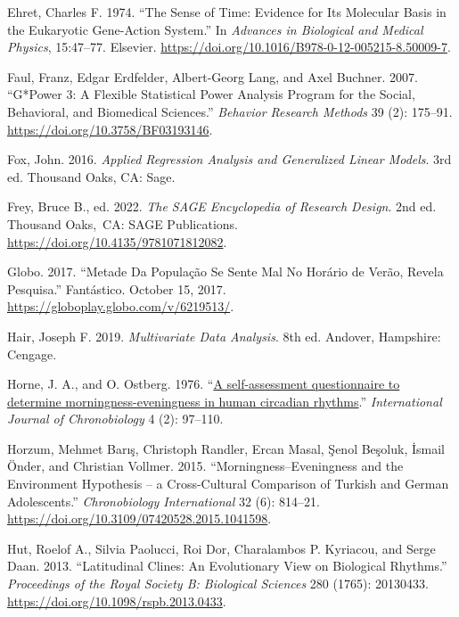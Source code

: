 \documentclass[
  12pt,
  a4paper,
  oneside]{tesesusp}
\newlength{\cslhangindent}
\newlength{\cslentryspacingunit} %
\newenvironment{CSLReferences}[2] %
 {%
  \setlength{\parindent}{0pt}
  \ifodd #1
  \let\oldpar\par
  \def\par{\hangindent=\cslhangindent\oldpar}
  \fi
  \setlength{\parskip}{#2\cslentryspacingunit}
 }%
 {}
\begin{document}
\begin{CSLReferences}{1}{0}
\leavevmode{}%
Ehret, Charles F. 1974. {``The Sense of Time: Evidence for Its Molecular
Basis in the Eukaryotic Gene-Action System.''} In \emph{Advances in
Biological and Medical Physics}, 15:47--77. Elsevier.
\url{https://doi.org/10.1016/B978-0-12-005215-8.50009-7}.

\leavevmode{}%
Faul, Franz, Edgar Erdfelder, Albert-Georg Lang, and Axel Buchner. 2007.
{``G*Power 3: A Flexible Statistical Power Analysis Program for the
Social, Behavioral, and Biomedical Sciences.''} \emph{Behavior Research
Methods} 39 (2): 175--91. \url{https://doi.org/10.3758/BF03193146}.

\leavevmode{}%
Fox, John. 2016. \emph{Applied Regression Analysis and Generalized
Linear Models}. 3rd ed. Thousand Oaks, CA: Sage.

\leavevmode{}%
Frey, Bruce B., ed. 2022. \emph{The SAGE Encyclopedia of Research
Design}. 2nd ed. Thousand Oaks,~CA: SAGE Publications.
\url{https://doi.org/10.4135/9781071812082}.

\leavevmode{}%
Globo. 2017. {``Metade Da População Se Sente Mal No Horário de Verão,
Revela Pesquisa.''} Fantástico. October 15, 2017.
\url{https://globoplay.globo.com/v/6219513/}.

\leavevmode{}%
Hair, Joseph F. 2019. \emph{Multivariate Data Analysis}. 8th ed.
Andover, Hampshire: Cengage.

\leavevmode{}%
Horne, J. A., and O. Ostberg. 1976.
{``\href{https://www.ncbi.nlm.nih.gov/pubmed/1027738}{A self-assessment
questionnaire to determine morningness-eveningness in human circadian
rhythms}.''} \emph{International Journal of Chronobiology} 4 (2):
97--110.

\leavevmode{}%
Horzum, Mehmet Barış, Christoph Randler, Ercan Masal, Şenol Beşoluk,
İsmail Önder, and Christian Vollmer. 2015. {``Morningness--Eveningness
and the Environment Hypothesis -- a Cross-Cultural Comparison of Turkish
and German Adolescents.''} \emph{Chronobiology International} 32 (6):
814--21. \url{https://doi.org/10.3109/07420528.2015.1041598}.

\leavevmode{}%
Hut, Roelof A., Silvia Paolucci, Roi Dor, Charalambos P. Kyriacou, and
Serge Daan. 2013. {``Latitudinal Clines: An Evolutionary View on
Biological Rhythms.''} \emph{Proceedings of the Royal Society B:
Biological Sciences} 280 (1765): 20130433.
\url{https://doi.org/10.1098/rspb.2013.0433}.


\end{CSLReferences}
\end{document}
